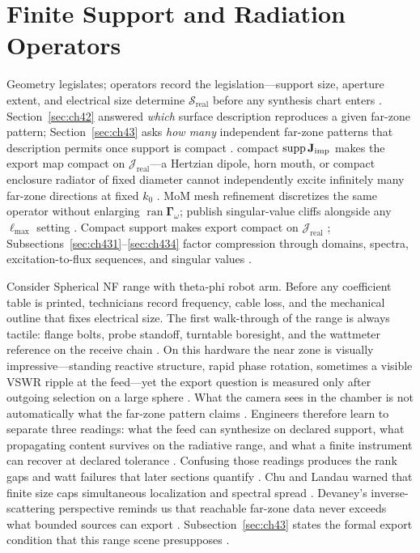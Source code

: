 \section{Finite Support and Radiation Operators}
Geometry legislates; operators record the legislation---support size, aperture extent, and electrical size determine $\mathcal{S}_{\mathrm{real}}$ before any synthesis chart enters \cite{chu1948}.
\label{sec:ch43}
Section~\ref{sec:ch42} answered \emph{which} surface description reproduces a given far-zone pattern; Section~\ref{sec:ch43} asks \emph{how many} independent far-zone patterns that description permits once support is compact \cite{stratton1941}. compact $\operatorname{supp}\mathbf{J}_{\mathrm{imp}}$ makes the export map compact on $\mathcal{J}_{\mathrm{real}}$---a Hertzian dipole, horn mouth, or compact enclosure radiator of fixed diameter cannot independently excite infinitely many far-zone directions at fixed $k_{0}$ \cite{stratton1941}. MoM mesh refinement discretizes the same operator without enlarging $\operatorname{ran}\boldsymbol{\Gamma}_\omega$; publish singular-value cliffs alongside any $\ell_{\max}$ setting \cite{harrington2001}.
Compact support makes export compact on $\mathcal{J}_{\mathrm{real}}$ \cite{stratton1941}; Subsections~\ref{sec:ch431}--\ref{sec:ch434} factor compression through domains, spectra, excitation-to-flux sequences, and singular values \cite{devaney2004}.
\begin{physicalvignette}
Consider Spherical NF range with theta-phi robot arm. Before any coefficient table is printed, technicians record frequency, cable loss, and the mechanical outline that fixes electrical size. The first walk-through of the range is always tactile: flange bolts, probe standoff, turntable boresight, and the wattmeter reference on the receive chain \cite{hansen1988}.
On this hardware the near zone is visually impressive---standing reactive structure, rapid phase rotation, sometimes a visible VSWR ripple at the feed---yet the export question is measured only after outgoing selection on a large sphere \cite{harrington2001}. What the camera sees in the chamber is not automatically what the far-zone pattern claims \cite{stratton1941}.
Engineers therefore learn to separate three readings: what the feed can synthesize on declared support, what propagating content survives on the radiative range, and what a finite instrument can recover at declared tolerance \cite{devaney2004}. Confusing those readings produces the rank gaps and watt failures that later sections quantify \cite{pal2026}.
Chu and Landau warned that finite size caps simultaneous localization and spectral spread \cite{chu1948}. Devaney's inverse-scattering perspective reminds us that reachable far-zone data never exceeds what bounded sources can export \cite{devaney2004}.
Subsection~\ref{sec:ch43} states the formal export condition that this range scene presupposes \cite{stratton1941}.
\end{physicalvignette}
